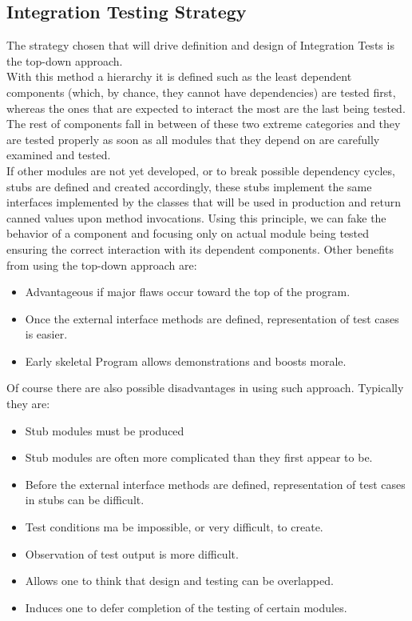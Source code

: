 \subsection{Integration Testing Strategy}
The strategy chosen that will drive definition and design of Integration Tests is the top-down approach. \\
With this method a hierarchy it is defined such as the least dependent components (which, by chance, they cannot have dependencies) are tested first, whereas the ones that are expected to interact the most are the last being tested. The rest of components fall in between of these two extreme categories and they are tested properly as soon as all modules that they depend on are carefully examined and tested. \\
If other modules are not yet developed, or to break possible dependency cycles, stubs are defined and created accordingly, these stubs implement the same interfaces implemented by the classes that will be used in production and return canned values upon method invocations. Using this principle, we can fake the behavior of a component and focusing only on actual module being tested ensuring the correct interaction with its dependent components.
Other benefits from using the top-down approach are:
\begin{itemize}
	\item Advantageous if major flaws occur toward the top of the program.
	\item Once the external interface methods are defined, representation of test cases is easier.
	\item Early skeletal Program allows demonstrations and boosts morale.
\end{itemize}
Of course there are also possible disadvantages in using such approach. Typically they are:
\begin{itemize}
	\item Stub modules must be produced
	\item Stub modules are often more complicated than they first appear to be.
	\item Before the external interface methods are defined, representation of test cases in stubs can be difficult.
	\item Test conditions ma be impossible, or very difficult, to create.
	\item Observation of test output is more difficult.
	\item Allows one to think that design and testing can be overlapped.
	\item Induces one to defer completion of the testing of certain modules.
\end{itemize}
